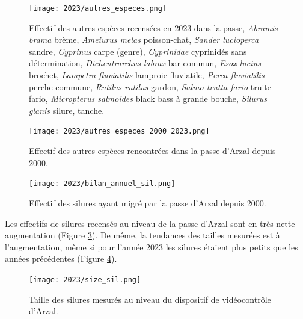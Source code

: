 \documentclass[11pt,twocolumn,titlepage,twoside]{article}\usepackage[]{graphicx}\usepackage[]{color}
\begin{document}
\begin{figure}[htpb]
\centering
\texttt{[image: 2023/autres\_especes.png]} 
\caption{Effectif des autres espèces recensées en 2023 dans la passe,
\textit{Abramis brama} brème, 
\textit{Ameiurus melas} poisson-chat,
\textit{Sander lucioperca} sandre,
\textit{Cyprinus} carpe (genre), \textit{Cyprinidae} cyprinidés sans détermination,
\textit{Dichentrarchus labrax} bar commun,
\textit{Esox lucius} brochet,
\textit{Lampetra fluviatilis} lamproie fluviatile,
\textit{Perca fluviatilis} perche commune,
\textit{Rutilus rutilus} gardon,
\textit{Salmo trutta fario} truite fario,
\textit{Micropterus salmoides} black bass à grande bouche, 
\textit{Silurus glanis} silure,
 tanche.}
\label{autres_especes}
\end{figure}



\begin{figure}[htpb]
\centering
\texttt{[image: 2023/autres\_especes\_2000\_2023.png]} 
\caption{Effectif des autres espèces rencontrées dans la passe d'Arzal depuis
2000.}
\label{autres_especes_2000_2023}
\end{figure}


\begin{figure}[htpb]
\centering
\texttt{[image: 2023/bilan\_annuel\_sil.png]} 
\caption{Effectif des silures ayant migré par la passe d'Arzal depuis
2000.}
\label{bilan_annuel_sil}
\end{figure}


Les effectifs de silures recensés au niveau de la passe d'Arzal sont en très
nette augmentation (Figure \ref{bilan_annuel_sil}). De même, la tendances des
tailles mesurées est à l'augmentation, même si pour l'année 2023 les silures
étaient plus petits que les années précédentes (Figure \ref{size_sil}).

\begin{figure}[htpb]
\centering
\texttt{[image: 2023/size\_sil.png]} 
\caption{Taille des silures mesurés au niveau du dispositif de vidéocontrôle
d'Arzal.}
\label{size_sil}
\end{figure}


\end{document}
